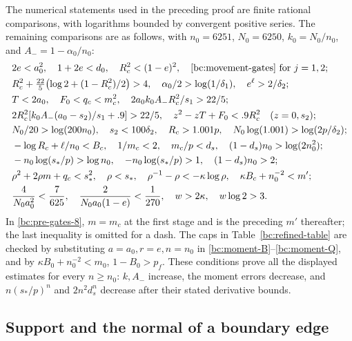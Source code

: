 \documentclass[11pt,reqno]{amsart}
\numberwithin{equation}{section}
\theoremstyle{definition}
\theoremstyle{remark}
\begin{document}
The numerical statements used in the preceding proof are finite rational
comparisons, with logarithms bounded by convergent positive series.
The remaining comparisons are as follows, with $n_0=6251$,
$N_0=6250$, $k_0=N_0/n_0$, and $A_-=1-\alpha_0/n_0$:
\begin{align}
 &2e<a_0^2,\quad 1+2e<d_0,\quad R_c^2<(1-e)^2,
       \quad\eqref{bc:movement-gates}\text{ for }j=1,2;
                                                        \label{bc:pre-gates-1}\\
 &R_c^2+\tfrac{22}5\bigl(\log2+(1-R_c^2)/2\bigr)>4,
       \quad \alpha_0/2>\log(1/\delta_1),
       \quad e^\ell>2/\delta_2;                         \label{bc:pre-gates-2}\\
 &T<2a_0,\quad F_0<q_c<m_c^2,\quad
       2a_0k_0A_-R_c^2/s_1>22/5;                       \label{bc:pre-gates-3}\\
 &2R_c^2[k_0A_-(a_0-s_2)/s_1+.9]>22/5,
       \quad z^2-zT+F_0<.9R_c^2\quad(z=0,s_2);         \label{bc:pre-gates-4}\\
 &N_0/20>\log(200n_0),\quad s_2<100\delta_2,
       \quad R_c>1.001p,
       \quad N_0\log(1.001)>\log(2p/\delta_2);         \label{bc:pre-gates-5}\\
 &-\log R_c+\ell/n_0<B_c,\quad 1/m_c<2,
       \quad m_c/p<d_s,
       \quad (1-d_s)n_0>\log(2n_0^2);                 \label{bc:pre-gates-6}\\
 &-n_0\log(s_*/p)>\log n_0,\quad
       -n_0\log(s_*/p)>1,\quad(1-d_s)n_0>2;           \label{bc:pre-gates-7}\\
 &\rho^2+2\rho m+q_c<s_*^2,\quad \rho<s_*,\quad
       \rho^{-1}-\rho<-\kappa\log\rho,
       \quad \kappa B_c+n_0^{-2}<m';                 \label{bc:pre-gates-8}\\
 &\frac4{N_0a_0^2}<\frac7{625},\quad
       \frac2{N_0a_0(1-e)}<\frac1{270},\quad
       w>2\kappa,\quad w\log2>3.                     \label{bc:pre-gates-9}
\end{align}
In \eqref{bc:pre-gates-8}, $m=m_c$ at the first stage and is the
preceding $m'$ thereafter; the last inequality is omitted for a dash.
The caps in Table~\ref{bc:refined-table} are checked by substituting
$a=a_0,r=e,n=n_0$ in \eqref{bc:moment-B}--\eqref{bc:moment-Q}, and by
$\kappa B_0+n_0^{-2}<m_0$, $1-B_0>p_f$.
These conditions prove all the displayed estimates for every $n\geq n_0$:
$k,A_-$ increase, the moment errors decrease, and
$n(s_*/p)^n$ and $2n^2d_s^n$ decrease after their stated derivative
bounds.

\subsection{Support and the normal of a boundary edge}
\end{document}
